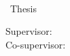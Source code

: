     \settowidth{\mylen}{\cftfigpresnum\cftfigaftersnum}
    \addtolength{\cftfignumwidth}{\mylen}
    
    \chapter*{\listfigures}
    \renewcommand\listfigurename{\vspace{-3.2em}}
    \listoffigures
\fi

\iftables
    \newpage
    \setlength{\cfttabindent}{0pt}
    \renewcommand{\tablename}{\tableName}
    
    \renewcommand\cfttabpresnum{\bfseries \tablename~}
    \renewcommand\cfttabaftersnum{\normalfont}
    
    \settowidth{\mylen}{\cfttabpresnum\cfttabaftersnum}
    \addtolength{\cfttabnumwidth}{\mylen}
    
    \chapter*{\listtables}
    \renewcommand\listtablename{\vspace{-3.2em}}
    
    \listoftables
\fi

\ifmaps
    \newpage
    \setlength{\cftfigindent}{0pt}
    
    \renewcommand\cftfigpresnum{\bfseries \mapName~ }
    \renewcommand\cftfigaftersnum{\normalfont}
    
    \setlength{\cftfignumwidth}{\tempp}
    \settowidth{\mylen}{\cftfigpresnum\cftfigaftersnum}
    \addtolength{\cftfignumwidth}{\mylen}
    \listofmaps
\fi


\ifnum{}
\ifnum{}
\newpage
\chapter*{\eabstract}

\begin{center}
{\bfseries \Large\titleEN}

\student

\departmentEN \\ {\degree~Thesis}

Supervisor: \advisorEN \\
\ifnum{}
Co-supervisor: \coadvisorEN
\fi  


\end{center}

